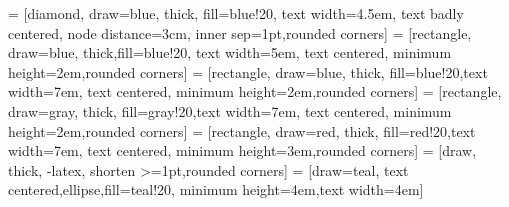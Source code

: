 
 = [diamond, draw=blue, thick, fill=blue!20, 
    text width=4.5em, text badly centered, node distance=3cm, inner sep=1pt,rounded corners]
 = [rectangle, draw=blue, thick,fill=blue!20, text width=5em, text centered, minimum height=2em,rounded corners]
 = [rectangle, draw=blue, thick, fill=blue!20,text width=7em, text centered, minimum height=2em,rounded corners]
 = [rectangle, draw=gray, thick, fill=gray!20,text width=7em, text centered, minimum height=2em,rounded corners]
 = [rectangle, draw=red, thick, fill=red!20,text width=7em, text centered, minimum height=3em,rounded corners]
 = [draw, thick, -latex, shorten >=1pt,rounded corners]
 = [draw=teal, text centered,ellipse,fill=teal!20,
    minimum height=4em,text width=4em]
    
